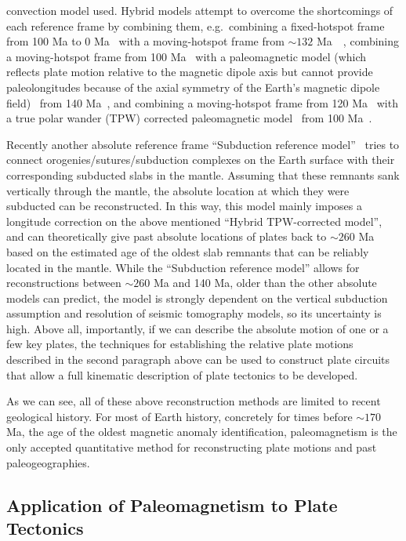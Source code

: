 convection model used. Hybrid models attempt to overcome the shortcomings of
each reference frame by combining them, e.g.\ combining a fixed-hotspot frame
from 100 Ma to 0 Ma~\citep{M93} with a moving-hotspot frame from
${\sim}132$ Ma~\citep{O05}~\citep[Hybrid hotspot model,
see][]{Sh12}, combining a moving-hotspot frame from 100
Ma~\citep{O05} with a paleomagnetic model (which reflects plate motion relative
to the magnetic dipole axis but cannot provide paleolongitudes because of the
axial symmetry of the Earth's magnetic dipole field)~\citep{T08} from
140 Ma~\citep[Hybrid paleomagnetic model, see][]{Sh12}, and
combining a moving-hotspot frame from 120 Ma~\citep{O05} with a
true polar wander (TPW) corrected paleomagnetic model~\citep{S08} from
100 Ma~\citep[Hybrid TPW-corrected model, see][]{Sh12}.

Recently another absolute reference frame ``Subduction reference
model''~\citep{v10} tries to connect orogenies/sutures/subduction complexes on
the Earth surface with their corresponding subducted slabs in the mantle.
Assuming that these remnants sank vertically through the mantle, the absolute
location at which they were subducted can be reconstructed. In this way, this
model mainly imposes a longitude correction on the above mentioned ``Hybrid
TPW-corrected model'', and can theoretically give past absolute locations of
plates back to ${\sim}260$ Ma based on the estimated age of the oldest slab
remnants that can be reliably located in the mantle. While the ``Subduction
reference model'' allows for reconstructions between ${\sim}260$ Ma and 140 Ma,
older than the other absolute models can predict, the model is strongly
dependent on the vertical subduction assumption and resolution of seismic
tomography models, so its uncertainty is high. Above all, importantly, if we can
describe the absolute motion of one or a few key plates, the techniques for
establishing the relative plate motions described in the second paragraph above
can be used to construct plate circuits that allow a full kinematic description
of plate tectonics to be developed.

As we can see, all of these above reconstruction methods are limited to recent
geological history. For most of Earth history, concretely for times before
${\sim}170$ Ma, the age of the oldest magnetic anomaly identification,
paleomagnetism is the only accepted quantitative method for reconstructing plate
motions and past paleogeographies.

\subsection{Application of Paleomagnetism to Plate
Tectonics}\label{sec:applPlateTec}


